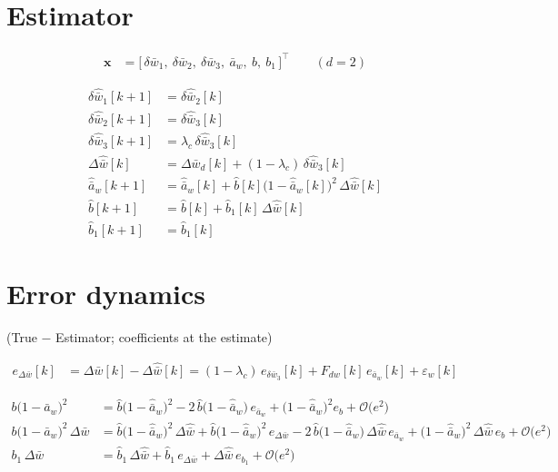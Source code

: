 \documentclass[11pt,a4paper,fontset=none]{ctexart}
\newcommand{\ba}{\bar{a}}
\newcommand{\bw}{\bar{w}}
\newcommand{\dW}{\Delta\bw}
\newcommand{\dWh}{\Delta\hat{\bw}}
\newcommand{\eD}{e_{\Delta\bw}}
\newcommand{\ah}{\hat{\ba}_w}
\newcommand{\bh}{\hat{b}}
\newcommand{\bhh}{\hat{b}_1}
\newcommand{\ea}{e_{\ba_w}}
\begin{document}
\section{Estimator}

\begin{align*}
\mathbf{x} &= \bigl[\,\delta\bw_1,\ \delta\bw_2,\ \delta\bw_3,\ \ba_w,\ b,\ b_1\,\bigr]^{\top} \qquad (d = 2)
\end{align*}

\begin{align*}
\delta\hat{\bw}_1[k+1] &= \delta\hat{\bw}_2[k] \\
\delta\hat{\bw}_2[k+1] &= \delta\hat{\bw}_3[k] \\
\delta\hat{\bw}_3[k+1] &= \lambda_c\,\delta\hat{\bw}_3[k] \\
\dWh[k]                &= \Delta\bw_d[k] + (1-\lambda_c)\,\delta\hat{\bw}_3[k] \\
\ah[k+1]               &= \ah[k] + \bh[k]\bigl(1-\ah[k]\bigr)^{2}\,\dWh[k] \\
\bh[k+1]               &= \bh[k] + \bhh[k]\,\dWh[k] \\
\bhh[k+1]              &= \bhh[k]
\end{align*}

\section{Error dynamics}

(True $-$ Estimator; coefficients at the estimate)

\begin{align*}
\eD[k] &= \dW[k] - \dWh[k] = (1-\lambda_c)\,e_{\delta\bw_3}[k] + F_{dw}[k]\,\ea[k] + \varepsilon_w[k]
\end{align*}

\begin{align*}
b\bigl(1-\ba_w\bigr)^{2}         &= \bh\bigl(1-\ah\bigr)^{2} - 2\,\bh\bigl(1-\ah\bigr)\,\ea + \bigl(1-\ah\bigr)^{2}e_b + \mathcal{O}\bigl(e^{2}\bigr) \\
b\bigl(1-\ba_w\bigr)^{2}\,\dW     &= \bh\bigl(1-\ah\bigr)^{2}\,\dWh + \bh\bigl(1-\ah\bigr)^{2}\,\eD - 2\,\bh\bigl(1-\ah\bigr)\,\dWh\,\ea
                                   + \bigl(1-\ah\bigr)^{2}\,\dWh\,e_b + \mathcal{O}\bigl(e^{2}\bigr) \\
b_1\,\dW                         &= \bhh\,\dWh + \bhh\,\eD + \dWh\,e_{b_1} + \mathcal{O}\bigl(e^{2}\bigr)
\end{align*}
\end{document}
